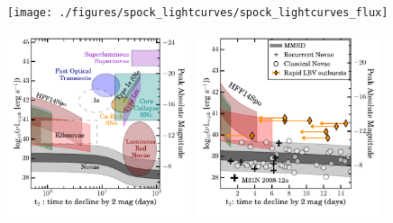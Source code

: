 \begin{figure}[tbp]
\begin{center}
\texttt{[image: ./figures/spock\_lightcurves/spock\_lightcurves\_flux]}
\caption{ \protect}
\end{center}
\end{figure}


\begin{figure}[tbp]
\begin{center}
\includegraphics[width=0.48\textwidth]{./figures/peakluminosity_vs_declinetime/peakluminosity_vs_declinetime_sn}
\includegraphics[width=0.48\textwidth]{./figures/peakluminosity_vs_declinetime/peakluminosity_vs_declinetime_nova_lbv}
\caption{ \protect}
\end{center}
\end{figure}


